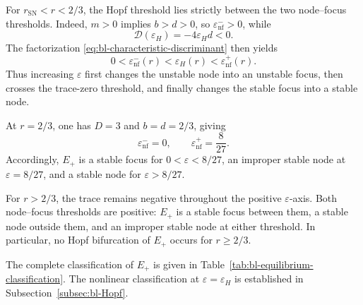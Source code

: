 \documentclass[11pt,reqno]{amsart}
\theoremstyle{plain}
\theoremstyle{definition}
\theoremstyle{remark}
\begin{document}
For $r_{\mathrm{SN}}<r<2/3$, the Hopf threshold lies
strictly between the two node--focus thresholds.
Indeed, $m>0$ implies $b>d>0$, so
$\varepsilon_{\mathrm{nf}}^->0$, while
\[
\mathcal D(\varepsilon_H)
=
-4\varepsilon_Hd<0.
\]
The factorization
\eqref{eq:bl-characteristic-discriminant} then yields
\begin{equation}
0
<
\varepsilon_{\mathrm{nf}}^-(r)
<
\varepsilon_H(r)
<
\varepsilon_{\mathrm{nf}}^+(r).
\label{eq:bl-threshold-order}
\end{equation}
Thus increasing $\varepsilon$ first changes the unstable
node into an unstable focus, then crosses the trace-zero
threshold, and finally changes the stable focus into a
stable node.

At $r=2/3$, one has $D=3$ and $b=d=2/3$, giving
\[
\varepsilon_{\mathrm{nf}}^-=0,
\qquad
\varepsilon_{\mathrm{nf}}^+=\frac{8}{27}.
\]
Accordingly, $E_+$ is a stable focus for
$0<\varepsilon<8/27$, an improper stable node at
$\varepsilon=8/27$, and a stable node for
$\varepsilon>8/27$.

For $r>2/3$, the trace remains negative throughout the
positive $\varepsilon$-axis. Both node--focus thresholds
are positive: $E_+$ is a stable focus between them,
a stable node outside them, and an improper stable node
at either threshold. In particular, no Hopf bifurcation
of $E_+$ occurs for $r\geq2/3$.

The complete classification of $E_+$ is given in
Table~\ref{tab:bl-equilibrium-classification}.
The nonlinear classification at
$\varepsilon=\varepsilon_H$ is established in
Subsection~\ref{subsec:bl-Hopf}.
\end{document}
